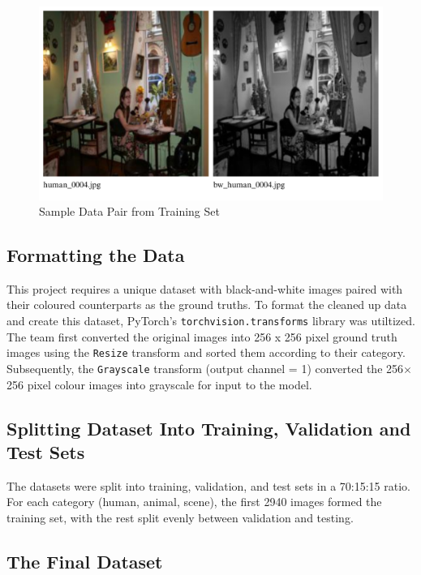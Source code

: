 \documentclass{article} %
\begin{document}
\begin{figure}[htbp]            %
  \centering
  \includegraphics[width=1\linewidth]{Figs/Data Example.png}
  \caption{Sample Data Pair from Training Set}
  \label{fig:data_example}
\end{figure}

\subsection{Formatting the Data}

This project requires a unique dataset with black-and-white images paired with their coloured counterparts as the ground truths. To format the cleaned up data and create this dataset, 
PyTorch's \verb|torchvision.transforms| library was utiltized. The team first converted the original images into 256 x 256 pixel ground truth images using the \verb|Resize| transform 
and sorted them according to their category. Subsequently, the \verb|Grayscale| transform (output channel = 1) converted the 256$\times$256 pixel colour images into grayscale for input to the model.

\subsection{Splitting Dataset Into Training, Validation and Test Sets}

The datasets were split into training, validation, and test sets in a 70:15:15 ratio. For each category (human, animal, scene), the first 2940 images formed the training set, with the rest
split evenly between validation and testing.

\subsection{The Final Dataset}
\end{document}
